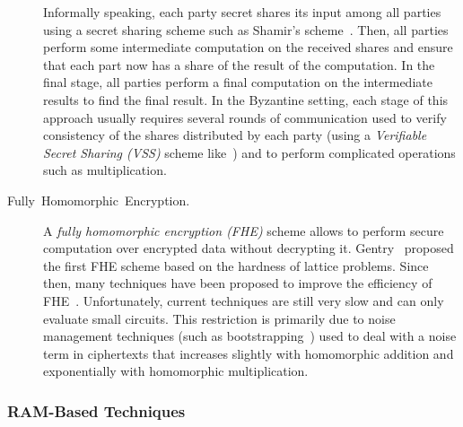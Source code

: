 \documentclass[11pt]{article}
\theoremstyle{plain}
\begin{document}
\begin{description}
	Informally speaking, each party secret shares its input among all
	parties using a secret sharing scheme such as Shamir's scheme~\cite{shamir:how}.
	Then, all parties perform some intermediate computation on the received
	shares and ensure that each part now has a share of the result of
	the computation. In the final stage, all parties perform a final computation
	on the intermediate results to find the final result. In the Byzantine
	setting, each stage of this approach usually requires several rounds
	of communication used to verify consistency of the shares distributed
	by each party (using a \emph{Verifiable Secret Sharing (VSS)} scheme
	like~\cite{Chor:1985:VSS:1382438.1382871,bgw88}) and to perform
	complicated operations such as multiplication.
	\item [{Fully~Homomorphic~Encryption.}] A \emph{fully homomorphic encryption
		(FHE)} scheme allows to perform secure computation over encrypted
	data without decrypting it. Gentry~\cite{Gentry:2009:FHE:1536414.1536440}
	proposed the first FHE scheme based on the hardness of lattice problems.
	Since then, many techniques have been proposed to improve the efficiency
	of FHE~\cite{vanDijk:2010:FHE:2163822.2163825,Brakerski:2012:FHE:2090236.2090262,Gentry:2012:FHE:2260849.2260887}.
	Unfortunately, current techniques are still very slow and can only
	evaluate small circuits. This restriction is primarily due to noise
	management techniques (such as bootstrapping~\cite{Gentry:2009:FHE:1536414.1536440})
	used to deal with a noise term in ciphertexts that increases slightly
	with homomorphic addition and exponentially with homomorphic multiplication.
\end{description}

\subsubsection{RAM-Based Techniques}
\end{document}
